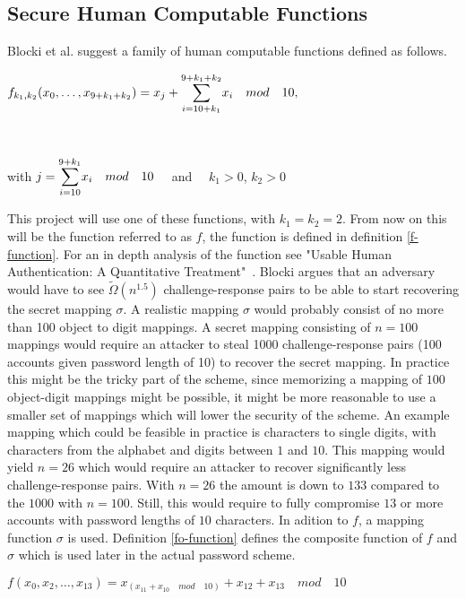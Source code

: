 \subsection{Secure Human Computable Functions}
Blocki et al. \cite{hcp-blocki} suggest a family of human computable functions defined as follows.
\centerline{ $ f_{k_1,k_2}(x_0,\dots,x_{9+k_1+k_2})= x_j + \mathlarger{\sum}\limits^{9+k_1+k_2}_{i=10+k_1} x_i \quad mod\quad 10,$}\\
\centerline{with $j = \mathlarger{\sum}\limits^{9+k_1}_{i=10} x_i \quad mod \quad 10\quad$ and $\quad k_1>0$, $k_2>0$ }
\vspace{2mm}
\par This project will use one of these functions, with $k_1=k_2=2$. From now on this will be the function referred to as $f$, the function is defined in definition \ref{f-function}. For an in depth analysis of the function see "Usable Human Authentication: A Quantitative Treatment"~\cite{Blocki2014}. Blocki argues that an adversary would have to see $\tilde \Omega(n^{1.5})$ challenge-response pairs to be able to start recovering the secret mapping $\sigma$. A realistic mapping $\sigma$ would probably consist of no more than 100 object to digit mappings. A secret mapping consisting of $n=100$ mappings would require an attacker to steal 1000 challenge-response pairs (100 accounts given password length of 10) to recover the secret mapping. In practice this might be the tricky part of the scheme, since memorizing a mapping of $100$ object-digit mappings might be possible, it might be more reasonable to use a smaller set of mappings which will lower the security of the scheme. An example mapping which could be feasible in practice is characters to single digits, with characters from the alphabet and digits between $1$ and $10$. This mapping would yield $n=26$ which would require an attacker to recover significantly less challenge-response pairs. With $n=26$ the amount is down to $133$ compared to the $1000$ with $n=100$. Still, this would require to fully compromise $13$ or more accounts with password lengths of $10$ characters. In adition to $f$, a mapping function $\sigma$ is used. Definition \ref{fo-function} defines the composite function of $f$ and $\sigma$ which is used later in the actual password scheme.


\begin{definition}
    \label{f-function}
    $f(x_0,x_2,\dots,x_{13}) = x_{(x_{11} + x_{10}\quad mod \quad 10)} + x_{12} + x_{13}\quad mod \quad 10$ 
\end{definition} 

